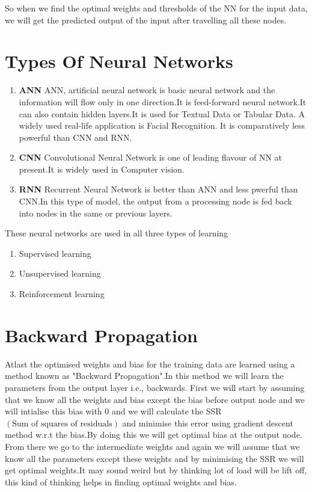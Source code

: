 \documentclass[journal,12pt,onecolumn]{IEEEtran}
\providecommand{\brak}[1]{\ensuremath{\left(#1\right)}}
\theoremstyle{remark}
\numberwithin{equation}{section}
\begin{document}
          So when we find the optimal weights and thresholds of the NN for the input data, we will get the predicted output of the input after travelling all these nodes.
          \section{Types Of Neural Networks}
            \begin{enumerate}
                \item \textbf{ANN} ANN, artificial neural network is basic neural network and the information will flow only in one direction.It is feed-forward neural network.It can also contain hidden layers.It is used for Textual Data or Tabular Data. A widely used real-life application is Facial Recognition. It is comparatively less powerful than CNN and RNN.
                \item \textbf{CNN} Convolutional Neural Network is one of leading flavour of NN at present.It is widely used in Computer vision.
                \item \textbf{RNN} Recurrent Neural Network is better than ANN and less pwerful than CNN.In this type of model, the output from a processing node is fed back into nodes in the same or previous layers. 
            \end{enumerate}
          These neural networks are used in all three types of learning
                 \begin{enumerate}
                   \item Supervised learning
                   \item Unsupervised learning
                   \item Reinforcement learning
                 \end{enumerate}
             \section{Backward Propagation}
       Atlast the optimised weights and bias for the training data are learned using a method known as "Backward Propagation".In this method we will learn the parameters from the output layer i.e., backwards. First we will start by assuming that we know all the weights and bias except the bias before output node and we will intialise this bias with 0 and we will calculate the SSR $\brak{\text{Sum of squares of residuals}}$ and minimise this error using gradient descent method w.r.t the bias.By doing this we will get optimal bias at the output node. From there we go to the intermediate weights and again we will assume that we know all the parameters except these weights and by minimising the SSR we will get optimal weights.It may sound weird but by thinking lot of load will be lift off, this kind of thinking helps in finding optimal weights and bias.
         
\end{document}
